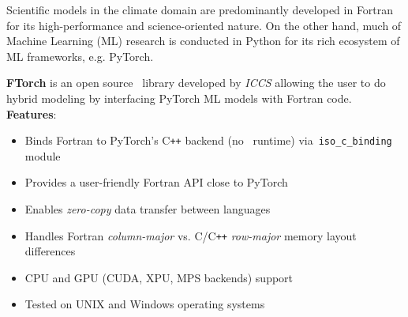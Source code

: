 Scientific models in the climate domain are predominantly developed in Fortran for its high-performance and science-oriented nature. On the other hand, much of Machine Learning (ML) research is conducted in Python for its rich ecosystem of ML frameworks, e.g. PyTorch. 

\textbf{FTorch} is an open source \href{https://github.com/Cambridge-ICCS/FTorch}{\textcolor{black}{\faGithub}}~library developed by \emph{ICCS} allowing the user to do hybrid modeling by interfacing PyTorch ML models with Fortran code. \\
\textbf{Features}:
\begin{itemize}
    \item Binds Fortran to PyTorch's C\texttt{++} backend (no \faPython~runtime) via~\texttt{iso\_c\_binding} module
    \item Provides a user-friendly Fortran API close to PyTorch
    \item Enables \emph{zero-copy} data transfer between languages
    \item Handles Fortran \emph{column-major} vs. C/C\texttt{++} \emph{row-major} memory layout differences
    \item CPU and GPU (CUDA, XPU, MPS backends) support
    \item Tested on UNIX and Windows operating systems
\end{itemize}


